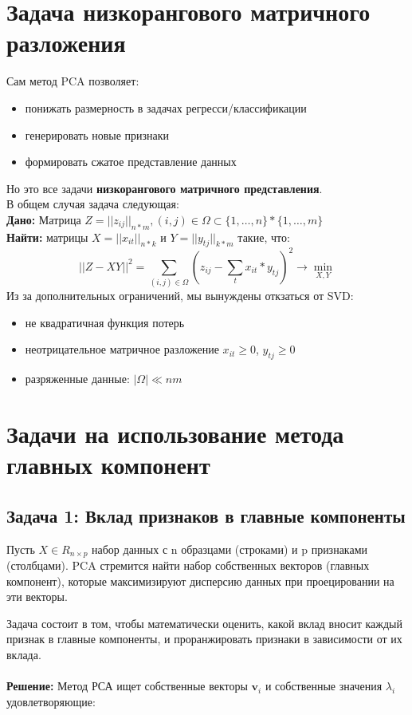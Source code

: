 \section{Задача низкорангового матричного разложения}
Сам метод PCA позволяет:
\begin{itemize}
    \item понижать размерность в задачах регресси/классификации
    \item генерировать новые признаки
    \item формировать сжатое представление данных
\end{itemize}
Но это все задачи \textbf{низкорангового матричного представления}. \\
В общем случая задача следующая: \\
\textbf{Дано:} Матрица $Z = ||z_{ij}||_{n*m}, (i, j) \in \Omega \subset \{1, \dots, n\}*\{1, \dots, m\}$  \\
\textbf{Найти:} матрицы $X=||x_{it}||_{n*k}$ и $Y = ||y_{tj}||_{k*m}$ такие, что:
$$
    ||Z-XY||^{2} = \sum_{(i,j) \in \Omega} (z_{ij} - \sum_t x_{it}*y_{tj})^2 \rightarrow \min_{X, Y}
$$
Из за дополнительных ограничений, мы вынуждены откзаться от SVD:
\begin{itemize}
    \item не квадратичная функция потерь
    \item неотрицательное матричное разложение $x_{it} \geq 0$, $y_{tj} \geq 0$
    \item разряженные данные: $|\Omega| \ll nm$
\end{itemize}

\section{Задачи на использование метода главных компонент}

\subsection{Задача 1: Вклад признаков в главные компоненты}
Пусть $X \in R_{n\times p}$ набор данных с n образцами (строками) и p признаками (столбцами). PCA стремится найти набор собственных векторов (главных компонент), которые максимизируют дисперсию данных при проецировании на эти векторы.

Задача состоит в том, чтобы математически оценить, какой вклад вносит каждый признак в главные компоненты, и проранжировать признаки в зависимости от их вклада.\\ \\
\textbf{Решение:}
Метод РСА ищет собственные векторы $\mathbf{v}_i$ и собственные значения $\lambda_i$ удовлетворяющие:

